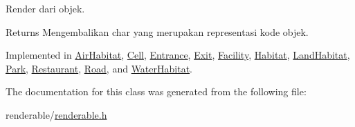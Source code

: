 Render dari objek. 

\begin{DoxyReturn}{Returns}
Mengembalikan char yang merupakan representasi kode objek. 
\end{DoxyReturn}


Implemented in \hyperlink{classAirHabitat_a6dd1a0d8235d9687874bb229099d40ff}{Air\+Habitat}, \hyperlink{classCell_a1d72940d69d96132a445212155e3e789}{Cell}, \hyperlink{classEntrance_a7226e0cd3d04f8370ede2573bc2852f3}{Entrance}, \hyperlink{classExit_a9239e8b13c101d1aee8fde738e8a5fdc}{Exit}, \hyperlink{classFacility_a177b3f9cd142fe4521c1d15b00d3675c}{Facility}, \hyperlink{classHabitat_ad1bf10205d38e8e308eb9acc3aa2872c}{Habitat}, \hyperlink{classLandHabitat_ad2147498f493b01429ae315f0145d3a9}{Land\+Habitat}, \hyperlink{classPark_a98b2a346d5ec6703b2e988588950947e}{Park}, \hyperlink{classRestaurant_a8a44dac5fd1d460aed3a5631e9eb732a}{Restaurant}, \hyperlink{classRoad_a72268486a71718b5b7957b63ecd565bc}{Road}, and \hyperlink{classWaterHabitat_a014ef4d2a9e5f37ac70a61d3f060b983}{Water\+Habitat}.



The documentation for this class was generated from the following file\+:\begin{DoxyCompactItemize}
\item 
renderable/\hyperlink{renderable_8h}{renderable.\+h}\end{DoxyCompactItemize}

